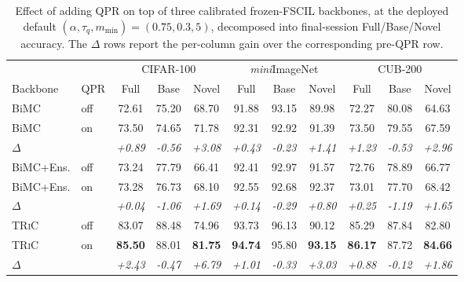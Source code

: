 \documentclass{iutbscthesis}
\begin{document}
\begin{table}[H]
    \centering
    \begin{tabular}{l l c c c c c c c c c}
        \toprule
        & & \multicolumn{3}{c}{CIFAR-100} & \multicolumn{3}{c}{\emph{mini}ImageNet} & \multicolumn{3}{c}{CUB-200} \\
        \cmidrule(lr){3-5} \cmidrule(lr){6-8} \cmidrule(lr){9-11}
        Backbone & QPR & Full & Base & Novel & Full & Base & Novel & Full & Base & Novel \\
        \midrule
        BiMC & off & 72.61 & 75.20 & 68.70 & 91.88 & 93.15 & 89.98 & 72.27 & 80.08 & 64.63 \\
        BiMC & on  & 73.50 & 74.65 & 71.78 & 92.31 & 92.92 & 91.39 & 73.50 & 79.55 & 67.59 \\
        \emph{$\Delta$} & & \emph{+0.89} & \emph{-0.56} & \emph{+3.08} & \emph{+0.43} & \emph{-0.23} & \emph{+1.41} & \emph{+1.23} & \emph{-0.53} & \emph{+2.96} \\
        \addlinespace
        BiMC+Ens. & off & 73.24 & 77.79 & 66.41 & 92.41 & 92.97 & 91.57 & 72.76 & 78.89 & 66.77 \\
        BiMC+Ens. & on  & 73.28 & 76.73 & 68.10 & 92.55 & 92.68 & 92.37 & 73.01 & 77.70 & 68.42 \\
        \emph{$\Delta$} & & \emph{+0.04} & \emph{-1.06} & \emph{+1.69} & \emph{+0.14} & \emph{-0.29} & \emph{+0.80} & \emph{+0.25} & \emph{-1.19} & \emph{+1.65} \\
        \addlinespace
        \textsc{TRiC} & off & 83.07 & 88.48 & 74.96 & 93.73 & 96.13 & 90.12 & 85.29 & 87.84 & 82.80 \\
        \textsc{TRiC} & on  & \textbf{85.50} & 88.01 & \textbf{81.75} & \textbf{94.74} & 95.80 & \textbf{93.15} & \textbf{86.17} & 87.72 & \textbf{84.66} \\
        \emph{$\Delta$} & & \emph{+2.43} & \emph{-0.47} & \emph{+6.79} & \emph{+1.01} & \emph{-0.33} & \emph{+3.03} & \emph{+0.88} & \emph{-0.12} & \emph{+1.86} \\
        \bottomrule
    \end{tabular}
    \caption{Effect of adding QPR on top of three calibrated frozen-FSCIL backbones, at the deployed default $(\alpha,\tau_q,m_{\min}) = (0.75, 0.3, 5)$, decomposed into final-session Full/Base/Novel accuracy. The $\Delta$ rows report the per-column gain over the corresponding pre-QPR row.}
    \label{tab:qpreffect}
\end{table}
\end{document}
